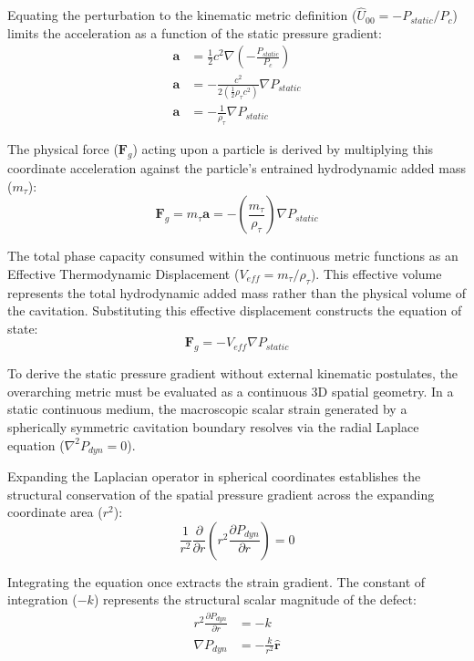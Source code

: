 Equating the perturbation to the kinematic metric definition ($\hat{U}_{00} = - P_{static}/P_c$) limits the acceleration as a function of the static pressure gradient: 
\begin{align}
    \mathbf{a} &= \frac{1}{2} c^2 \nabla \left( - \frac{P_{static}}{P_c} \right) \nonumber \\
    \mathbf{a} &= - \frac{c^2}{2 \left( \frac{1}{2}\rho_\tau c^2 \right)} \nabla P_{static} \nonumber \\
    \mathbf{a} &= - \frac{1}{\rho_\tau} \nabla P_{static} \label{eq:tensor_buoyancy_acceleration}
\end{align}

The physical force ($\mathbf{F}_g$) acting upon a particle is derived by multiplying this coordinate acceleration against the particle's entrained hydrodynamic added mass ($m_\tau$):
\begin{equation}
    \mathbf{F}_g = m_\tau \mathbf{a} = - \left( \frac{m_\tau}{\rho_\tau} \right) \nabla P_{static}
\end{equation}

The total phase capacity consumed within the continuous metric functions as an Effective Thermodynamic Displacement ($V_{eff} = m_\tau / \rho_\tau$). This effective volume represents the total hydrodynamic added mass rather than the physical volume of the cavitation. Substituting this effective displacement constructs the equation of state: 
\begin{equation}
    \mathbf{F}_g = - V_{eff} \nabla P_{static} \label{eq:archimedes_gravity_base}
\end{equation}

To derive the static pressure gradient without external kinematic postulates, the overarching metric must be evaluated as a continuous 3D spatial geometry. In a static continuous medium, the macroscopic scalar strain generated by a spherically symmetric cavitation boundary resolves via the radial Laplace equation ($\nabla^2 P_{dyn} = 0$). 

Expanding the Laplacian operator in spherical coordinates establishes the structural conservation of the spatial pressure gradient across the expanding coordinate area ($r^2$):
\begin{equation}
    \frac{1}{r^2} \frac{\partial}{\partial r} \left( r^2 \frac{\partial P_{dyn}}{\partial r} \right) = 0
\end{equation}

Integrating the equation once extracts the strain gradient. The constant of integration ($-k$) represents the structural scalar magnitude of the defect:
\begin{align}
    r^2 \frac{\partial P_{dyn}}{\partial r} &= -k \nonumber \\
    \nabla P_{dyn} &= -\frac{k}{r^2} \mathbf{\hat{r}}
\end{align}

